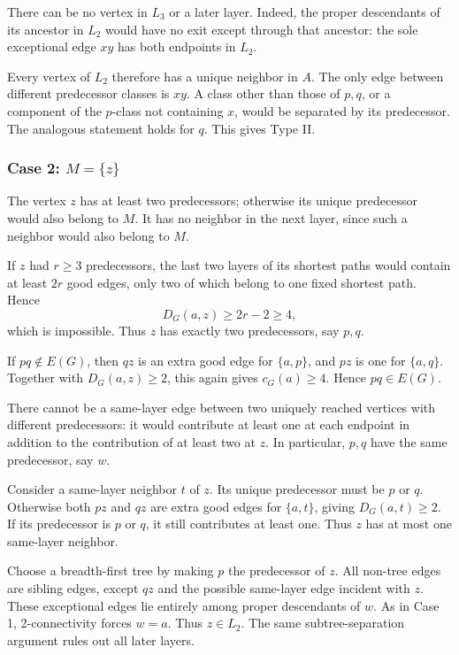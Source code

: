 \documentclass[
  11pt,
  a4paper,
]{article}
\begin{document}
There can be no vertex in \(L_3\) or a later layer. Indeed, the proper
descendants of its ancestor in \(L_2\) would have no exit except through
that ancestor: the sole exceptional edge \(xy\) has both endpoints in
\(L_2\).

Every vertex of \(L_2\) therefore has a unique neighbor in \(A\). The
only edge between different predecessor classes is \(xy\). A class other
than those of \(p,q\), or a component of the \(p\)-class not containing
\(x\), would be separated by its predecessor. The analogous statement
holds for \(q\). This gives Type II.

\subsubsection{\texorpdfstring{Case 2:
\(M=\{z\}\)}{Case 2: M=\textbackslash\{z\textbackslash\}}}\label{case-2-mz}

The vertex \(z\) has at least two predecessors; otherwise its unique
predecessor would also belong to \(M\). It has no neighbor in the next
layer, since such a neighbor would also belong to \(M\).

If \(z\) had \(r\ge3\) predecessors, the last two layers of its shortest
paths would contain at least \(2r\) good edges, only two of which belong
to one fixed shortest path. Hence \[
D_G(a,z)\ge2r-2\ge4,
\] which is impossible. Thus \(z\) has exactly two predecessors, say
\(p,q\).

If \(pq\notin E(G)\), then \(qz\) is an extra good edge for \(\{a,p\}\),
and \(pz\) is one for \(\{a,q\}\). Together with \(D_G(a,z)\ge2\), this
again gives \(c_G(a)\ge4\). Hence \(pq\in E(G)\).

There cannot be a same-layer edge between two uniquely reached vertices
with different predecessors: it would contribute at least one at each
endpoint in addition to the contribution of at least two at \(z\). In
particular, \(p,q\) have the same predecessor, say \(w\).

Consider a same-layer neighbor \(t\) of \(z\). Its unique predecessor
must be \(p\) or \(q\). Otherwise both \(pz\) and \(qz\) are extra good
edges for \(\{a,t\}\), giving \(D_G(a,t)\ge2\). If its predecessor is
\(p\) or \(q\), it still contributes at least one. Thus \(z\) has at
most one same-layer neighbor.

Choose a breadth-first tree by making \(p\) the predecessor of \(z\).
All non-tree edges are sibling edges, except \(qz\) and the possible
same-layer edge incident with \(z\). These exceptional edges lie
entirely among proper descendants of \(w\). As in Case 1, 2-connectivity
forces \(w=a\). Thus \(z\in L_2\). The same subtree-separation argument
rules out all later layers.
\end{document}
